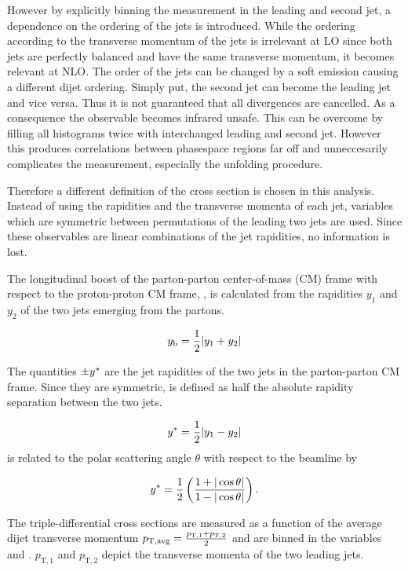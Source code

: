 However by explicitly binning the measurement in the leading and second jet, a
dependence on the ordering of the jets is introduced. While the ordering
according to the transverse momentum of the jets is irrelevant at LO
since both jets are perfectly balanced and have the same transverse momentum, it
becomes relevant at NLO. The order of the jets can be changed by a soft emission
causing a different dijet ordering. Simply put, the second jet can become the
leading jet and vice versa. Thus it is not guaranteed that all divergences are
cancelled. As a consequence the observable becomes infrared unsafe. This can be
overcome by filling all histograms twice with interchanged leading and second
jet. However this produces correlations between phasespace regions far off and
unneccesarily complicates the measurement, especially the unfolding procedure.

Therefore a different definition of the cross section is chosen in this
analysis. Instead of using the rapidities and the transverse momenta of each
jet, variables which are symmetric between permutations of the leading two jets
are used. Since these observables are linear combinations of the jet rapidities,
no information is lost.


The longitudinal boost of the parton-parton center-of-mass (CM) frame with
respect to the proton-proton CM frame, \yboost, is calculated from the
rapidities $y_1$ and $y_2$ of the two jets emerging from the partons. 

\begin{equation*}
    y_{\mathrm{b}} = \frac{1}{2} |y_1 + y_2|
\end{equation*}

The quantities $\pm y^*$ are the jet rapidities of the two jets in the
parton-parton CM frame. Since they are symmetric, \ystar is defined as half the
absolute rapidity separation between the two jets.

\begin{equation*}
    y^* = \frac{1}{2} |y_1 - y_2|
\end{equation*}
\ystar is related to the polar scattering angle $\theta$ with respect to the
beamline by 

\begin{equation*}
    y^* = \frac{1}{2} \left( \frac{1 + |\cos \theta|}{1- | \cos \theta|} \right).
\end{equation*}

The triple-differential cross sections are measured as a function of the average dijet
transverse momentum $p_{\mathrm{T,avg}} = \frac{p_{\mathrm{T},1} + p_{\mathrm{T},2}}{2}$ and
are binned in the variables \ystar and \yboost. $p_{\mathrm{T},1}$ and
$p_{\mathrm{T},2}$ depict the transverse momenta of the two leading jets. 

